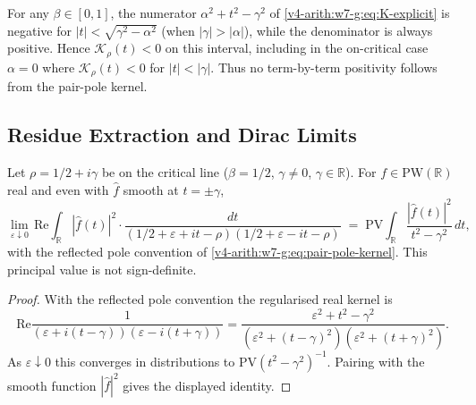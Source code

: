 \begin{remark}
\label{v4-arith:w7-g:rem:off-critical-sign}
For any \(\beta\in[0,1]\), the numerator \(\alpha^{2}+t^{2}-\gamma^{2}\)
of \eqref{v4-arith:w7-g:eq:K-explicit} is negative for
\(|t|<\sqrt{\gamma^{2}-\alpha^{2}}\) (when \(|\gamma|>|\alpha|\)), while
the denominator is always positive. Hence \(\mathcal{K}_{\rho}(t)<0\)
on this interval, including in the on-critical case \(\alpha=0\) where
\(\mathcal{K}_{\rho}(t)<0\) for \(|t|<|\gamma|\). Thus no
term-by-term positivity follows from the pair-pole kernel.
\end{remark}

\subsection{Residue Extraction and Dirac Limits}
\label{v4-arith:w7-g:pair-pole:residue}

\begin{lemma}
\label{v4-arith:w7-g:lem:residue-extract}
Let \(\rho=1/2+i\gamma\) be on the critical
line (\(\beta=1/2\), \(\gamma\neq 0\), \(\gamma\in\mathbb{R}\)). For \(f\in\mathrm{PW}(\mathbb{R})\)
real and even with \(\widehat{f}\) smooth at \(t=\pm\gamma\),
\begin{equation}
\label{v4-arith:w7-g:eq:residue-on-critical}
\lim_{\varepsilon\downarrow 0}\,\mathrm{Re}\!\int_{\mathbb{R}}|\widehat{f}(t)|^{2}\cdot\frac{dt}{(1/2+\varepsilon+it-\rho)(1/2+\varepsilon-it-\rho)}
\;=\;\mathrm{PV}\!\int_{\mathbb R}\frac{|\widehat f(t)|^{2}}{t^{2}-\gamma^{2}}\,dt,
\end{equation}
with the reflected pole convention of
\eqref{v4-arith:w7-g:eq:pair-pole-kernel}. This principal value is not
sign-definite.
\end{lemma}

\begin{proof}
With the reflected pole convention the regularised real kernel is
\[
\mathrm{Re}\frac{1}{(\varepsilon+i(t-\gamma))(\varepsilon-i(t+\gamma))}
=\frac{\varepsilon^{2}+t^{2}-\gamma^{2}}
{(\varepsilon^{2}+(t-\gamma)^{2})(\varepsilon^{2}+(t+\gamma)^{2})}.
\]
As \(\varepsilon\downarrow0\) this converges in distributions to
\(\mathrm{PV}(t^{2}-\gamma^{2})^{-1}\). Pairing with the smooth
function \(|\widehat f|^{2}\) gives the displayed identity.
\end{proof}

